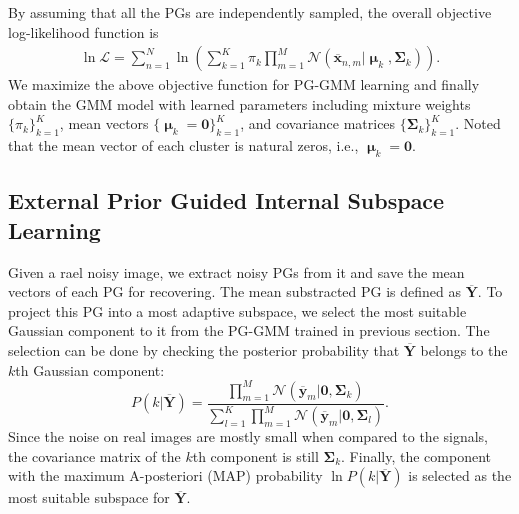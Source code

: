 \documentclass[10pt,twocolumn,letterpaper]{article}
\begin{document}
By assuming that all the PGs are independently sampled, the overall objective log-likelihood function is
\begin{equation}\label{equ2}
\begin{split}
\ln\mathcal{L}=\sum_{n=1}^{N} \ln(\sum_{k=1}^{K}\pi_{k}\prod_{m=1}^{M}\mathcal{N}(\mathbf{\overline{x}}_{n,m}|\boldsymbol{\upmu}_{k},\mathbf{\Sigma}_{k})).
\end{split}
\end{equation} 
We maximize the above objective function for PG-GMM learning and  finally obtain the GMM model with learned parameters including mixture weights $\{\pi_{k}\}_{k=1}^{K}$, mean vectors $\{\boldsymbol{\upmu}_{k}=\mathbf{0}\}_{k=1}^{K}$, and covariance matrices $\{\mathbf{\Sigma}_{k}\}_{k=1}^{K}$. Noted that the mean vector of each cluster is natural zeros, i.e., $\boldsymbol{\upmu}_{k}=\mathbf{0}$.

\subsection{External Prior Guided Internal Subspace Learning}
Given a rael noisy image, we extract noisy PGs from it and save the mean vectors of each PG for recovering. The mean substracted PG is defined as $\mathbf{\overline{Y}}$. To project this PG into a most adaptive subspace, we select the most suitable Gaussian component to it from the PG-GMM trained in previous section. The selection can be done by checking the posterior probability that $\mathbf{\overline{Y}}$ belongs to the $k$th Gaussian component:
\begin{equation}\label{equ3}
P(k|\mathbf{\overline{Y}})=\frac{\prod_{m=1}^{M}\mathcal{N}(\mathbf{\overline{y}}_{m}|\mathbf{0},\mathbf{\Sigma}_{k})}{\sum_{l=1}^{K}\prod_{m=1}^{M}\mathcal{N}(\mathbf{\overline{y}}_{m}|\mathbf{0},\mathbf{\Sigma}_{l})}.
\end{equation}
Since the noise on real images are mostly small when compared to the signals, the covariance matrix of the $k$th component is still $\mathbf{\Sigma}_{k}$. Finally, the component with the maximum A-posteriori (MAP) probability $\ln P(k|\mathbf{\overline{Y}})$ is selected as the most suitable subspace for $\mathbf{\overline{Y}}$.
\end{document}
